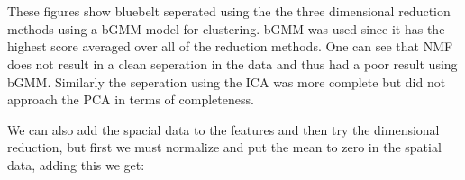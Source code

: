 \documentclass[11pt]{article}
\begin{document}
    \begin{center}
    \end{center}
    { \hspace*{\fill} \\}
    
    \begin{center}
    \end{center}
    { \hspace*{\fill} \\}
    


    These figures show bluebelt seperated using the the three dimensional
reduction methods using a bGMM model for clustering. bGMM was used since
it has the highest score averaged over all of the reduction methods. One
can see that NMF does not result in a clean seperation in the data and
thus had a poor result using bGMM. Similarly the seperation using the
ICA was more complete but did not approach the PCA in terms of
completeness.

We can also add the spacial data to the features and then try the
dimensional reduction, but first we must normalize and put the mean to
zero in the spatial data, adding this we get:



    \begin{center}
    \end{center}
    { \hspace*{\fill} \\}
    
    \begin{center}
    \end{center}
    { \hspace*{\fill} \\}
    
    \begin{center}
    \end{center}
    { \hspace*{\fill} \\}
    
\end{document}

